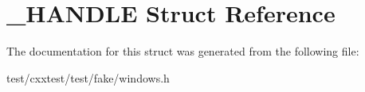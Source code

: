 \hypertarget{struct__HANDLE}{\section{\-\_\-\-H\-A\-N\-D\-L\-E Struct Reference}
\label{struct__HANDLE}
}


The documentation for this struct was generated from the following file\-:\begin{DoxyCompactItemize}
\item 
test/cxxtest/test/fake/windows.\-h\end{DoxyCompactItemize}
